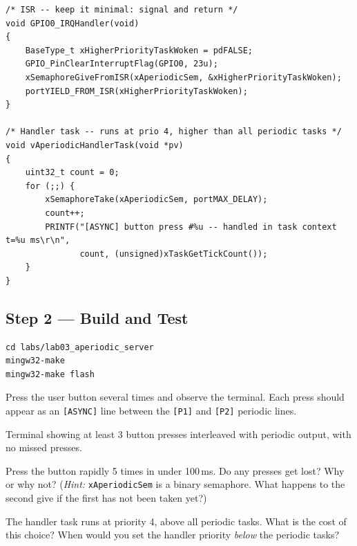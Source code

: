 \documentclass[11pt, a4paper]{article}
\begin{document}
\begin{lstlisting}[style=cstyle]
/* ISR -- keep it minimal: signal and return */
void GPIO0_IRQHandler(void)
{
    BaseType_t xHigherPriorityTaskWoken = pdFALSE;
    GPIO_PinClearInterruptFlag(GPIO0, 23u);
    xSemaphoreGiveFromISR(xAperiodicSem, &xHigherPriorityTaskWoken);
    portYIELD_FROM_ISR(xHigherPriorityTaskWoken);
}

/* Handler task -- runs at prio 4, higher than all periodic tasks */
void vAperiodicHandlerTask(void *pv)
{
    uint32_t count = 0;
    for (;;) {
        xSemaphoreTake(xAperiodicSem, portMAX_DELAY);
        count++;
        PRINTF("[ASYNC] button press #%u -- handled in task context  t=%u ms\r\n",
               count, (unsigned)xTaskGetTickCount());
    }
}
\end{lstlisting}

\subsection{Step 2 --- Build and Test}

\begin{lstlisting}[style=bashstyle]
cd labs/lab03_aperiodic_server
mingw32-make
mingw32-make flash
\end{lstlisting}

Press the user button several times and observe the terminal. Each press should appear as
an \texttt{[ASYNC]} line between the \texttt{[P1]} and \texttt{[P2]} periodic lines.

\begin{checkpointbox}[~A]
  Terminal showing at least 3 button presses interleaved with periodic output,
  with no missed presses.
\end{checkpointbox}

\begin{questionbox}[~A1]
  Press the button rapidly 5 times in under 100\,ms. Do any presses get lost? Why or
  why not?
  (\emph{Hint:} \texttt{xAperiodicSem} is a binary semaphore. What happens to the second
  give if the first has not been taken yet?)
\end{questionbox}

\begin{questionbox}[~A2]
  The handler task runs at priority 4, above all periodic tasks. What is the cost of this
  choice? When would you set the handler priority \emph{below} the periodic tasks?
\end{questionbox}

\end{document}
